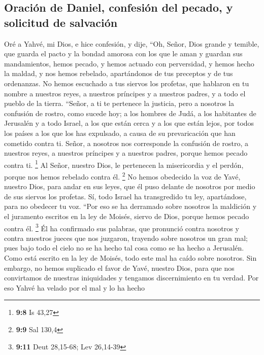 \hypertarget{oraciuxf3n-de-daniel-confesiuxf3n-del-pecado-y-solicitud-de-salvaciuxf3n}{%
\subsection{Oración de Daniel, confesión del pecado, y solicitud de
salvación}\label{oraciuxf3n-de-daniel-confesiuxf3n-del-pecado-y-solicitud-de-salvaciuxf3n}}

 Oré a Yahvé, mi Dios, e hice confesión, y dije, ``Oh,
Señor, Dios grande y temible, que guarda el pacto y la bondad amorosa
con los que le aman y guardan sus mandamientos,  hemos
pecado, y hemos actuado con perversidad, y hemos hecho la maldad, y nos
hemos rebelado, apartándonos de tus preceptos y de tus ordenanzas.
 No hemos escuchado a tus siervos los profetas, que
hablaron en tu nombre a nuestros reyes, a nuestros príncipes y a
nuestros padres, y a todo el pueblo de la tierra. 
``Señor, a ti te pertenece la justicia, pero a nosotros la confusión de
rostro, como sucede hoy; a los hombres de Judá, a los habitantes de
Jerusalén y a todo Israel, a los que están cerca y a los que están
lejos, por todos los países a los que los has expulsado, a causa de su
prevaricación que han cometido contra ti.  Señor, a
nosotros nos corresponde la confusión de rostro, a nuestros reyes, a
nuestros príncipes y a nuestros padres, porque hemos pecado contra ti.
\footnote{\textbf{9:8} Is 43,27}  Al Señor, nuestro Dios,
le pertenecen la misericordia y el perdón, porque nos hemos rebelado
contra él. \footnote{\textbf{9:9} Sal 130,4}  No hemos
obedecido la voz de Yavé, nuestro Dios, para andar en sus leyes, que él
puso delante de nosotros por medio de sus siervos los profetas.
 Sí, todo Israel ha transgredido tu ley, apartándose,
para no obedecer tu voz. ``Por eso se ha derramado sobre nosotros la
maldición y el juramento escritos en la ley de Moisés, siervo de Dios,
porque hemos pecado contra él. \footnote{\textbf{9:11} Deut 28,15-68;
  Lev 26,14-39}  Él ha confirmado sus palabras, que
pronunció contra nosotros y contra nuestros jueces que nos juzgaron,
trayendo sobre nosotros un gran mal; pues bajo todo el cielo no se ha
hecho tal cosa como se ha hecho a Jerusalén.  Como está
escrito en la ley de Moisés, todo este mal ha caído sobre nosotros. Sin
embargo, no hemos suplicado el favor de Yavé, nuestro Dios, para que nos
convirtamos de nuestras iniquidades y tengamos discernimiento en tu
verdad.  Por eso Yahvé ha velado por el mal y lo ha hecho
